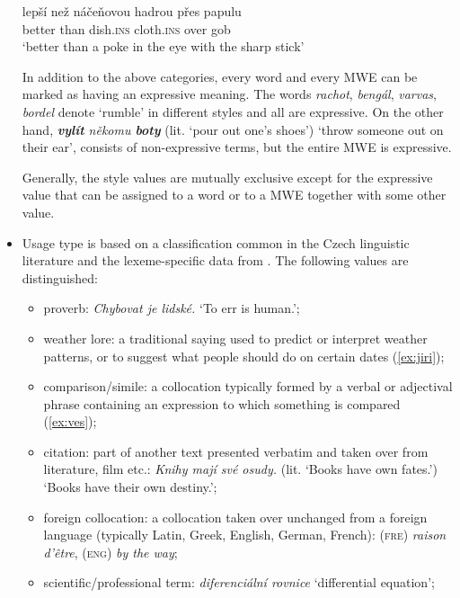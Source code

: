 \documentclass[output=paper,colorlinks,citecolor=brown]{langscibook}
\begin{document}
\begin{itemize}
\ea \label{ex:papula}
\gll lepší než náčeňovou hadrou přes papulu\\ 
better than dish.\textsc{ins} cloth.\textsc{ins} over gob\\
\glt `better than a poke in the eye with the sharp stick'
\z 


In addition to the above categories, every word and every MWE can be marked as having an expressive meaning. The words \textit{rachot}, \textit{bengál}, \textit{varvas}, \textit{bordel} denote `rumble' in different styles and all are expressive. On the other hand, \textit{\textbf{vylít} někomu \textbf{boty}} (lit. `pour out one's shoes') `throw someone out on their ear',  consists of non-expressive terms, but the entire MWE is expressive.

\noindent
Generally, the style values are mutually exclusive except for the expressive value that can be assigned to a word or to a MWE together with some other value.

\item Usage type is based on a classification
common in the Czech linguistic literature
\citep{Cermak:2016a} and the lexeme-specific data from \citet{Cermak:2009}.
The following values are distinguished:

\begin{itemize}
    \item proverb: \emph{Chybovat je lidské.} `To err is human.';

    \item weather lore: a traditional saying used to predict or interpret weather patterns, or to suggest what people should do on certain dates (\ref{ex:jiri});

    \item comparison/simile: a collocation 
    typically formed by a verbal or adjectival phrase containing an expression to which something is compared (\ref{ex:ves});
 
\item citation: part of another text presented verbatim and taken over
from literature, film etc.: \emph{Knihy mají své osudy.} (lit. `Books have own fates.') ‘Books have their own destiny.’;


    \item foreign collocation: a collocation taken over unchanged from a foreign
language (typically Latin, Greek, English, German, French): (\textsc{fre}) \emph{raison d’être}, (\textsc{eng}) \emph{by the way};
    \item scientific/professional term: \emph{diferenciální rovnice} ‘differential equation’;
    

\end{itemize}
\end{itemize}
\end{document}
